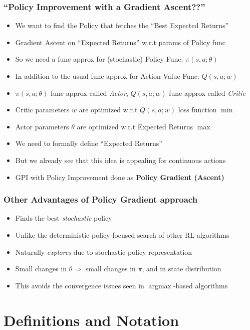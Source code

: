 \documentclass{beamer}
\DeclareMathOperator*{\argmax}{argmax}
\begin{document}
\begin{frame}
\frametitle{``Policy Improvement with a Gradient Ascent??''}
\pause
\begin{itemize}[<+->]
\item We want to find the Policy that fetches the ``Best Expected Returns''
\item Gradient Ascent on ``Expected Returns'' w.r.t params of Policy func
\item So we need a func approx for (stochastic) Policy Func: $\pi(s, a; \theta)$
\item In addition to the usual func approx for Action Value Func: $Q(s, a; w)$
\item $\pi(s, a; \theta)$ func approx called {\em Actor}, $Q(s, a; w)$ func approx called {\em Critic}
\item Critic parameters $w$ are optimized w.r.t $Q(s, a; w)$ loss function $\min$
\item Actor parameters $\theta$ are optimized w.r.t Expected Returns $\max$
\item We need to formally define ``Expected Returns''
\item But we already see that this idea is appealing for continuous actions
\item GPI with Policy Improvement done as {\bf Policy Gradient (Ascent)}
\end{itemize}
\end{frame}

\begin{frame}
\frametitle{Other Advantages of Policy Gradient approach}
\pause
\begin{itemize}[<+->]
\item Finds the best {\em stochastic} policy
\item Unlike the deterministic policy-focused search of other RL algorithms
\item Naturally {\em explores} due to stochastic policy representation
\item Small changes in $\theta \Rightarrow$ small changes in $\pi$, and in state distribution
\item This avoids the convergence issues seen in $\argmax$-based algorithms 
\end{itemize}
\end{frame}

\section{Definitions and Notation}
\end{document}
